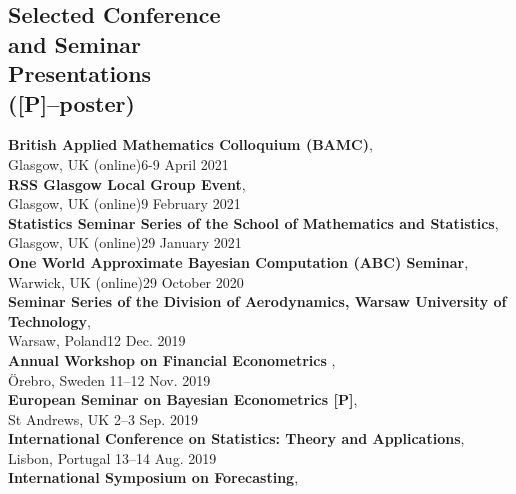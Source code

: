 \documentclass[margin,line]{resume}
\begin{document}
\begin{resume}
\vspace{-2mm}

\section{\mysidestyle Selected Conference \\and Seminar \\Presentations \\ ([P]--poster)} 
	\textbf{British Applied Mathematics Colloquium (BAMC)},\\
	Glasgow, UK (online)\hfill 6-9 April 2021\vspace{1mm} \\
	\textbf{RSS Glasgow Local Group Event},\\
	Glasgow, UK (online)\hfill 9 February 2021 \vspace{1mm} \\
	\textbf{Statistics Seminar Series of the School of Mathematics and Statistics},\\
	Glasgow, UK (online)\hfill 29 January 2021 \vspace{1mm} \\
	\textbf{One World Approximate Bayesian Computation (ABC) Seminar},\\
	Warwick, UK (online)\hfill 29 October 2020\vspace{1mm} \\	
	\textbf{Seminar Series of the Division of Aerodynamics, Warsaw University of Technology},\\
	Warsaw, Poland\hfill 12 Dec. 2019 \vspace{1mm} \\
	\textbf{ Annual Workshop on Financial Econometrics },\\
	{\"O}rebro, Sweden \hfill 11--12 Nov. 2019 \vspace{1mm} \\
	\textbf{ European Seminar on Bayesian Econometrics [P]},\\
	St Andrews, UK \hfill 2--3 Sep. 2019 \vspace{1mm} \\
	\textbf{International Conference on Statistics: Theory and Applications},\\
	Lisbon, Portugal \hfill 13--14 Aug. 2019 \vspace{1mm} \\		
	\textbf{ International Symposium on Forecasting},\\

\end{resume}
\end{document}
